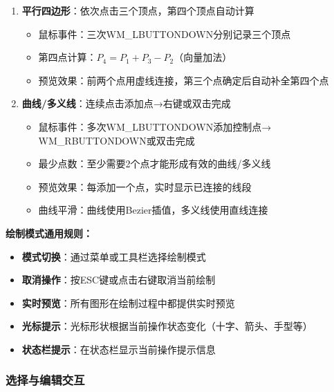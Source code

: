 \documentclass[12pt,a4paper]{article}
\begin{document}
\begin{tcolorbox}
\begin{enumerate}
    \item \textbf{平行四边形}：依次点击三个顶点，第四个顶点自动计算
    \begin{itemize}
        \item 鼠标事件：三次WM\_LBUTTONDOWN分别记录三个顶点
        \item 第四点计算：$P_4 = P_1 + P_3 - P_2$（向量加法）
        \item 预览效果：前两个点用虚线连接，第三个点确定后自动补全第四个点
    \end{itemize}
    
    \item \textbf{曲线/多义线}：连续点击添加点→右键或双击完成
    \begin{itemize}
        \item 鼠标事件：多次WM\_LBUTTONDOWN添加控制点→ WM\_RBUTTONDOWN或双击完成
        \item 最少点数：至少需要2个点才能形成有效的曲线/多义线
        \item 预览效果：每添加一个点，实时显示已连接的线段
        \item 曲线平滑：曲线使用Bezier插值，多义线使用直线连接
    \end{itemize}
\end{enumerate}

\textbf{绘制模式通用规则：}
\begin{itemize}
    \item \textbf{模式切换}：通过菜单或工具栏选择绘制模式
    \item \textbf{取消操作}：按ESC键或点击右键取消当前绘制
    \item \textbf{实时预览}：所有图形在绘制过程中都提供实时预览
    \item \textbf{光标提示}：光标形状根据当前操作状态变化（十字、箭头、手型等）
    \item \textbf{状态栏提示}：在状态栏显示当前操作提示信息
\end{itemize}
\end{tcolorbox}

\subsubsection{选择与编辑交互}
\end{document}
